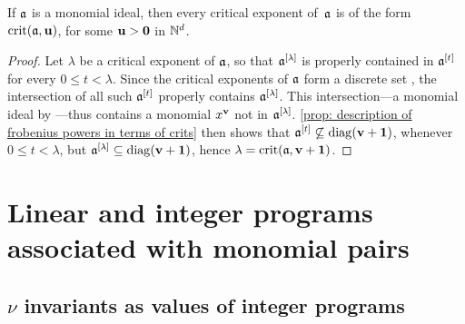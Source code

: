 \documentclass[11pt]{amsart}
\begin{document}
\begin{corollary}
   If $\mathfrak{a}$ is a monomial ideal, then every critical exponent of~$\mathfrak{a}$ is of the form $\operatorname{crit}(\mathfrak{a},\mathbf{u})$, for some $\mathbf{u} > \mathbf{0}$ in $\mathbb{N}^d$.
\end{corollary}

\begin{proof}
   Let $\lambda$ be a critical exponent of $\mathfrak{a}$, so that $\mathfrak{a}^{[\lambda]}$ is properly contained in $\mathfrak{a}^{[t]}$ for every $0 \le t <\lambda$.
   Since the critical exponents of $\mathfrak{a}$ form a discrete set \cite[Corollary~5.8]{hernandez+etal.frobenius_powers}, the intersection of all such $\mathfrak{a}^{[t]}$ properly contains $\mathfrak{a}^{[\lambda]}$.
   This intersection---a monomial ideal by ---thus contains a monomial $x^{\mathbf{v}}$ not in $\mathfrak{a}^{[\lambda]}$.
   \cref{prop: description of frobenius powers in terms of crits} then shows that $\mathfrak{a}^{[t]}\not\subseteq \operatorname{diag}(\mathbf{v}+\mathbf{1})$, whenever $0\le t < \lambda$, but $\mathfrak{a}^{[\lambda]} \subseteq \operatorname{diag}(\mathbf{v}+\mathbf{1})$, hence $\lambda = \operatorname{crit}(\mathfrak{a},\mathbf{v}+\mathbf{1})$.
\end{proof}



\newpage
\section{Linear and integer programs associated with monomial pairs}
\label{sec: LPs}

\subsection{$\nu$ invariants as values of integer programs}

\ 
\end{document}

